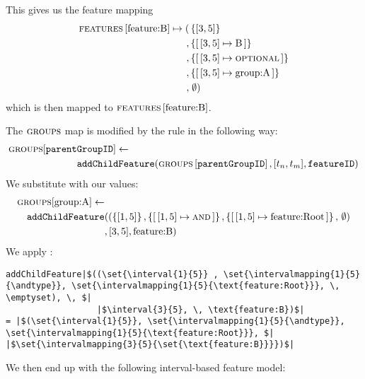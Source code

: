  This gives us the feature mapping
\begin{align*}
  \lookup{\features{}}{\text{feature:B}} \mapsto ( & \set{\interval{3}{5}} \\
  , & \set{\intervalmapping{3}{5}{\text{B}}}\\
  , & \set{\intervalmapping{3}{5}{\optional{}}}\\
  , & \set{\intervalmapping{3}{5}{\text{group:A}}}\\
  , & \; \emptyset)
\end{align*}
which is then mapped to $\textsc{features}{} \left[ \text{feature:B} \right]$.

The $\textsc{groups}{}{}$ map is modified by the rule in the following way:
\begin{align*}
  \groups{}[\var{parent}&\var{GroupID}] \assign  \\
                                &\var{addChildFeature}(\lookup{\groups{}}{\var{parentGroupID}}, \interval{t_n}{t_m}, \var{featureID})
\end{align*}
We substitute with our values:
\begin{align*}
  \groups{}[\text{group:A}] \assign & \\
  \var{addChildFeature}&((\set{\interval{1}{5}} , \set{\intervalmapping{1}{5}{\andtype}}, \set{\intervalmapping{1}{5}{\text{feature:Root}}} , \, \emptyset) \\
                                &, \interval{3}{5}, \text{feature:B})
\end{align*}
We apply :
\begin{verbatim}
addChildFeature|$((\set{\interval{1}{5}} , \set{\intervalmapping{1}{5}{\andtype}}, \set{\intervalmapping{1}{5}{\text{feature:Root}}}, \, \emptyset), \, $|
                  |$\interval{3}{5}, \, \text{feature:B})$|
= |$(\set{\interval{1}{5}}, \set{\intervalmapping{1}{5}{\andtype}}, \set{\intervalmapping{1}{5}{\text{feature:Root}}}, $| |$\set{\intervalmapping{3}{5}{\set{\text{feature:B}}}})$|
\end{verbatim}
We then end up with the following interval-based feature model:

